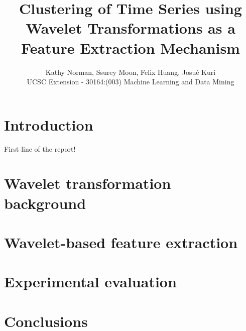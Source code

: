 \documentclass{article}
\title{Clustering of Time Series using Wavelet Transformations as a Feature Extraction Mechanism}
\author{\textsf{Kathy Norman, Ssurey Moon, Felix Huang, Josu\'e Kuri}\\UCSC Extension - 30164:(003) Machine Learning and Data Mining}
\begin{document}
\maketitle

\section{Introduction}
First line of the report!

\section{Wavelet transformation background}

\section{Wavelet-based feature extraction}

\section{Experimental evaluation}

\section{Conclusions}
\end{document}
